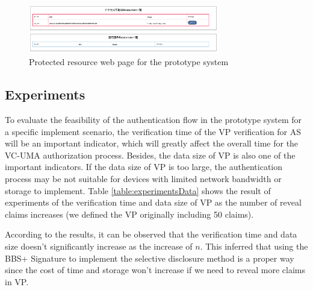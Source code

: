 \documentclass[conference, dvipdfmx]{IEEEtran} %
\begin{document}
\begin{sloppypar}
\begin{figure}[htbp] %
  \begin{center} %
  \includegraphics[width=83mm]{images/access_resource.png} %
  \caption{Protected resource web page for the prototype system} %
  \label{fig:access_resource} %
  \end{center}
\end{figure}

\subsection{Experiments}
To evaluate the feasibility of the authentication flow in the prototype system for a specific implement scenario, the verification time of the VP verification for AS will be an important indicator, which will greatly affect the overall time for the VC-UMA authorization process.
Besides, the data size of VP is also one of the important indicators. If the data size of VP is too large, the authentication process may be not suitable for devices with limited network bandwidth or storage to implement. 
Table \ref{table:experimentsData} shows the result of experiments of the verification time and data size of VP as the number of reveal claims increases (we defined the VP originally including 50 claims).

According to the results, it can be observed that the verification time and data size doesn't significantly increase as the increase of $n$.
This inferred that using the BBS+ Signature to implement the selective disclosure method is a proper way since the cost of time and storage won't increase if we need to reveal more claims in VP.

\begin{table}[htbp]
  \begin{center}
  \caption{Experimental results for Verifiable Presentation Verification Time and Data Size}
  \label{table:experimentsData}
  \small
  \end{center}
\end{table}


\end{sloppypar}
\end{document}

